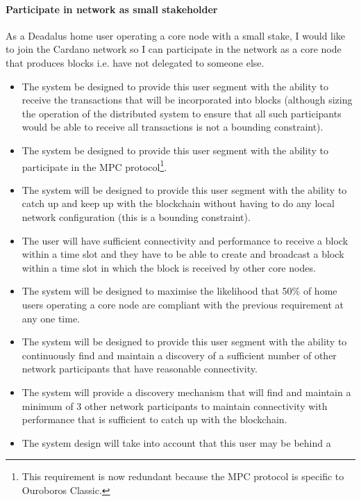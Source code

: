 \documentclass{report}
\theoremstyle{definition}{
  \newtheorem{lemma}{Lemma}[section] %
  \newtheorem{definition}[lemma]{Definition}
}
\theoremstyle{theorem}{
  \newtheorem{invariant}[lemma]{Invariant}
  \newtheorem{proofobligation}[lemma]{Proof Obligation}
}
\numberwithin{equation}{lemma}
\begin{document}
\paragraph{Participate in network as small stakeholder}

As a Deadalus home user operating a core node with a small stake, I would like
to join the Cardano network so I can participate in the network as a core node
that produces blocks i.e. have not delegated to someone else.

\begin{itemize}
\item The system be designed to provide this user segment with the ability to
      receive the transactions that will be incorporated into blocks (although
      sizing the operation of the distributed system to ensure that all such
      participants would be able to receive all transactions is not a bounding
      constraint).
\item The system be designed to provide this user segment with the ability to
      participate in the MPC protocol\footnote{This requirement is now
      redundant because the MPC protocol is specific to Ouroboros Classic.}.
\item The system will be designed to provide this user segment with the ability
      to catch up and keep up with the blockchain without having to do any local
      network configuration (this is a bounding constraint).
\item The user will have sufficient connectivity and performance to receive a
      block within a time slot {\sc and} they have to be able to create and
      broadcast a block within a time slot in which the block is received by
      other core nodes.
\item The system will be designed to maximise the likelihood that 50\% of home
      users operating a core node are compliant with the previous requirement
      at any one time.
\item The system will be designed to provide this user segment with the ability
      to continuously find and maintain a discovery of a sufficient number of
      other network participants that have reasonable connectivity.
\item The system will provide a discovery mechanism that will find and maintain
      a minimum of 3 other network participants to maintain connectivity with
      performance that is sufficient to catch up with the blockchain.
\item The system design will take into account that this user may be behind a

\end{itemize}
\end{document}
